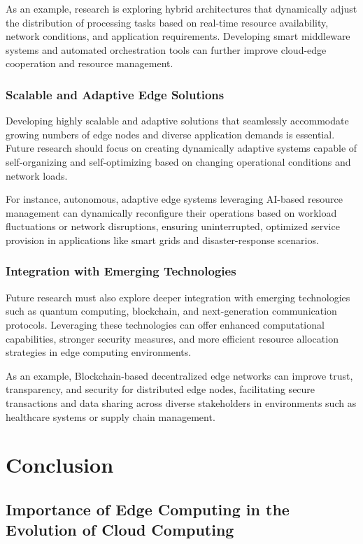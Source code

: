 \documentclass[runningheads]{llncs}
\begin{document}
\noindent As an example, research is exploring hybrid architectures that dynamically adjust the distribution of processing tasks based on real-time resource availability, network conditions, and application requirements. Developing smart middleware systems and automated orchestration tools can further improve cloud-edge cooperation and resource management.

\subsubsection{Scalable and Adaptive Edge Solutions}
Developing highly scalable and adaptive solutions that seamlessly accommodate growing numbers of edge nodes and diverse application demands is essential. Future research should focus on creating dynamically adaptive systems capable of self-organizing and self-optimizing based on changing operational conditions and network loads.

\noindent For instance, autonomous, adaptive edge systems leveraging AI-based resource management can dynamically reconfigure their operations based on workload fluctuations or network disruptions, ensuring uninterrupted, optimized service provision in applications like smart grids and disaster-response scenarios.

\subsubsection{Integration with Emerging Technologies}
Future research must also explore deeper integration with emerging technologies such as quantum computing, blockchain, and next-generation communication protocols. Leveraging these technologies can offer enhanced computational capabilities, stronger security measures, and more efficient resource allocation strategies in edge computing environments.

\noindent As an example, Blockchain-based decentralized edge networks can improve trust, transparency, and security for distributed edge nodes, facilitating secure transactions and data sharing across diverse stakeholders in environments such as healthcare systems or supply chain management.

\section{Conclusion}
\subsection{Importance of Edge Computing in the Evolution of Cloud Computing}
\end{document}
